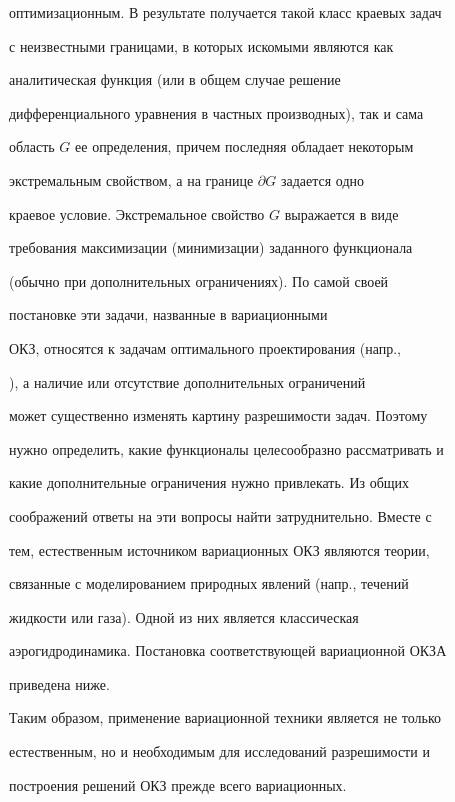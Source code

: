 оптимизационным. В результате получается такой класс краевых задач


с неизвестными границами, в которых искомыми являются как


аналитическая функция (или в общем случае решение


дифференциального уравнения в частных производных), так и сама


область $G$ ее определения, причем последняя обладает некоторым


экстремальным свойством, а на границе $\partial G$ задается одно


краевое условие. Экстремальное свойство $G$ выражается в виде


требования максимизации (минимизации) заданного функционала


(обычно при дополнительных ограничениях). По самой своей


постановке эти задачи, названные в \cite{Eliz2} вариационными


ОКЗ, относятся к задачам оптимального проектирования (напр.,


\cite{Hasl}), а наличие или отсутствие дополнительных ограничений


может существенно изменять картину разрешимости задач. Поэтому


нужно определить, какие функционалы целесообразно рассматривать и


какие дополнительные ограничения нужно привлекать. Из общих


соображений ответы на эти вопросы найти затруднительно. Вместе с


тем, естественным источником вариационных ОКЗ являются теории,


связанные с моделированием природных явлений (напр., течений


жидкости или газа). Одной из них является классическая


аэрогидродинамика. Постановка соответствующей вариационной ОКЗА


приведена ниже.





Таким образом, применение вариационной техники является не только


естественным, но и необходимым для исследований разрешимости и


построения решений ОКЗ прежде всего вариационных. 





